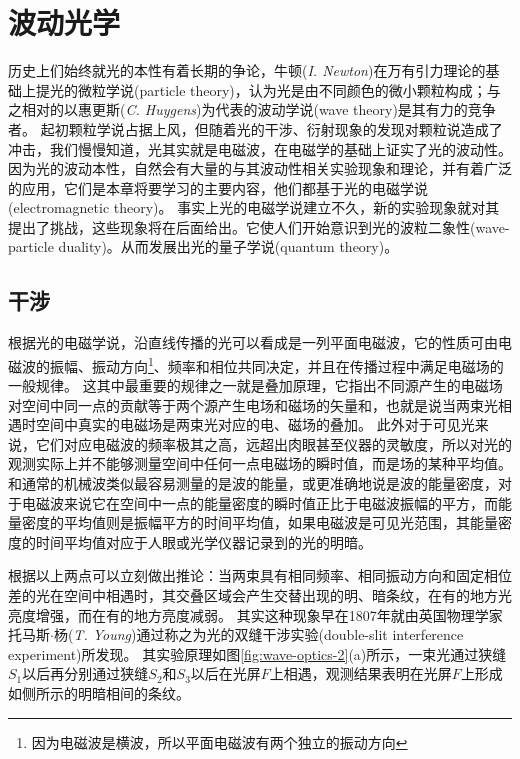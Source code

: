 
\chapter{波动光学}

历史上们始终就光的本性有着长期的争论，{\heiti 牛顿}({\it I. Newton})在万有引力理论的基础上提光的{\heiti 微粒学说}(particle theory)，认为光是由不同颜色的微小颗粒构成；与之相对的以{\heiti 惠更斯}({\it C. Huygens})为代表的{\heiti 波动学说}(wave theory)是其有力的竞争者。
起初颗粒学说占据上风，但随着光的干涉、衍射现象的发现对颗粒说造成了冲击，我们慢慢知道，光其实就是电磁波，在电磁学的基础上证实了光的波动性。
因为光的波动本性，自然会有大量的与其波动性相关实验现象和理论，并有着广泛的应用，它们是本章将要学习的主要内容，他们都基于光的{\heiti 电磁学说}(electromagnetic theory)。
事实上光的电磁学说建立不久，新的实验现象就对其提出了挑战，这些现象将在后面给出。它使人们开始意识到光的{\heiti 波粒二象性}(wave-particle duality)。从而发展出光的{\heiti 量子学说}(quantum theory)。


\section{干涉}
根据光的电磁学说，沿直线传播的光可以看成是一列平面电磁波，它的性质可由电磁波的振幅、振动方向\footnote{因为电磁波是横波，所以平面电磁波有两个独立的振动方向}、频率和相位共同决定，并且在传播过程中满足电磁场的一般规律。
这其中最重要的规律之一就是叠加原理，它指出不同源产生的电磁场对空间中同一点的贡献等于两个源产生电场和磁场的矢量和，也就是说当两束光相遇时空间中真实的电磁场是两束光对应的电、磁场的叠加。
此外对于可见光来说，它们对应电磁波的频率极其之高，远超出肉眼甚至仪器的灵敏度，所以对光的观测实际上并不能够测量空间中任何一点电磁场的瞬时值，而是场的某种平均值。
和通常的机械波类似最容易测量的是波的能量，或更准确地说是波的能量密度，对于电磁波来说它在空间中一点的能量密度的瞬时值正比于电磁波振幅的平方，而能量密度的平均值则是振幅平方的时间平均值，如果电磁波是可见光范围，其能量密度的时间平均值对应于人眼或光学仪器记录到的光的明暗。

根据以上两点可以立刻做出推论：当两束具有相同频率、相同振动方向和固定相位差的光在空间中相遇时，其交叠区域会产生交替出现的明、暗条纹，在有的地方光亮度增强，而在有的地方亮度减弱。
其实这种现象早在1807年就由英国物理学家托马斯$\cdot$杨({\it T. Young})通过称之为光的{\heiti 双缝干涉实验}(double-slit interference experiment)所发现。
其实验原理如图\ref{fig:wave-optics-2}(a)所示，一束光通过狭缝$S_1$以后再分别通过狭缝$S_2$和$S_3$以后在光屏$F$上相遇，观测结果表明在光屏$F$上形成如侧所示的明暗相间的条纹。

